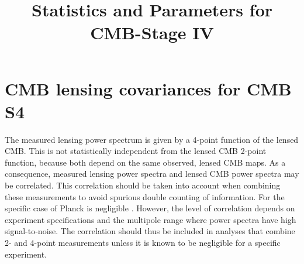 \documentclass[prd,superscriptaddress,nofootinbib,floatfix,notitlepage]{revtex4-1}
\begin{document}
\newcommand{\nonflat}[1]{#1}
\newcommand{\Cgl}{C_{\text{gl}}}
\newcommand{\Cgltwo}{C_{\text{gl},2}}
\newcommand{\He}{{\rm{He}}}
\newcommand{\Mhz}{{\rm MHz}}
\newcommand{\vx}{{\mathbf{x}}}
\newcommand{\ve}{{\mathbf{e}}}
\newcommand{\vv}{{\mathbf{v}}}
\newcommand{\vk}{{\mathbf{k}}}
\newcommand{\vn}{{\mathbf{n}}}
\newcommand{\vPsi}{{\mathbf{\Psi}}}
\newcommand{\vs}{{\mathbf{s}}}
\newcommand{\vH}{{\mathbf{H}}}
\newcommand{\theo}{\mathrm{th}}
\newcommand{\lin}{\mathrm{lin}}
\newcommand{\rec}{\mathrm{rec}}
\newcommand{\vnhat}{{\hat{\mathbf{n}}}}
\newcommand{\vkhat}{{\hat{\mathbf{k}}}}
\newcommand{\taueps}{{\tau_\epsilon}}
\newcommand{\vgrad}{{\mathbf{\nabla}}}
\newcommand{\fbarln}{\bar{f}_{,\ln\epsilon}(\epsilon)}
\newcommand{\secref}[1]{Section \ref{#1}}
\newcommand{\expt}{\mathrm{expt}}
\newcommand{\eq}[1]{(\ref{eq:#1})} 
\newcommand{\eqq}[1]{Eq.~(\ref{eq:#1})} 
\newcommand{\fig}[1]{Fig.~\ref{fig:#1}} 
\renewcommand{\to}{\rightarrow}
\renewcommand{\(}{\left(}
\renewcommand{\)}{\right)}
\renewcommand{\[}{\left[}
\renewcommand{\]}{\right]}
\renewcommand{\vec}[1]{\mathbf{#1}}
\newcommand{\vy}{\vec{y}}
\newcommand{\vz}{\vec{z}}
\newcommand{\vq}{\vec{q}}
\newcommand{\VPsi}{\vec{\Psi}}
\newcommand{\vecv}{\vec{v}}
\newcommand{\vnabla}{\vec{\nabla}}
\newcommand{\vl}{\vec{l}}
\newcommand{\vL}{\vec{L}}
\newcommand{\dl}{\d^2\vl}
\newcommand{\valpha}{\vec{\alpha}}
\renewcommand{\L}{\mathscr{L}}
\newcommand{\abs}[1]{\lvert #1\rvert}
\newcommand{\ul}{\underline{l}}
\newcommand{\yucode}{\textsf{FastPM}~{}}

\thispagestyle{empty}


\title{Statistics and Parameters for CMB-Stage IV}

\maketitle
\section{CMB lensing covariances for CMB S4}
\label{se:covs}

The measured lensing power spectrum is given by a 4-point function of the lensed CMB.  This is not statistically independent from the lensed CMB 2-point function, because both depend on the same observed, lensed CMB maps.  As a consequence, measured lensing power spectra and lensed CMB power spectra may be correlated.  This correlation should be taken into account when combining these measurements to avoid spurious double counting of information.  For the specific case of Planck is negligible  \cite{marcel1308}.  However, the level of correlation depends on experiment specifications and the multipole range where power spectra have high signal-to-noise.  The correlation should thus be included in analyses that combine 2- and 4-point measurements unless it is known to be negligible for a specific experiment. 
\end{document}
